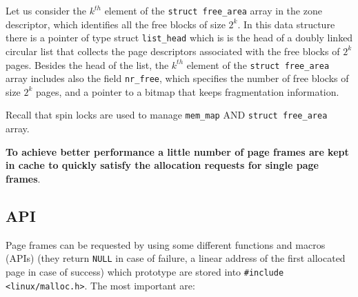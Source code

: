 \documentclass[10pt,a4paper]{article}
\begin{document}
Let us consider the $k^{th}$ element of the \texttt{struct free\_area} array in the zone descriptor, which identifies all the free blocks of size $2^k$. In this data structure there is a pointer of type struct \texttt{list\_head}  which is is the head of a doubly linked circular list that collects the page descriptors associated with the free blocks of $2^k$ pages. Besides the head of the list, the $k^{th}$ element of the \texttt{struct free\_area} array includes also the field \texttt{nr\_free}, which specifies the number of free blocks of size $2^k$ pages, and a pointer to a bitmap that keeps fragmentation information.  

Recall that spin locks are used to manage \texttt{mem\_map} AND \texttt{struct free\_area} array.

\textbf{To achieve better performance a little number of page frames are kept in cache to quickly satisfy the allocation requests for single page frames}.

\subsection{API}

Page frames can be requested by using some different functions and macros (APIs) (they return \texttt{NULL} in case of failure, a linear address of the first allocated page in case of success) which prototype are stored into \texttt{\#include <linux/malloc.h>}. The most important are:
\end{document}
